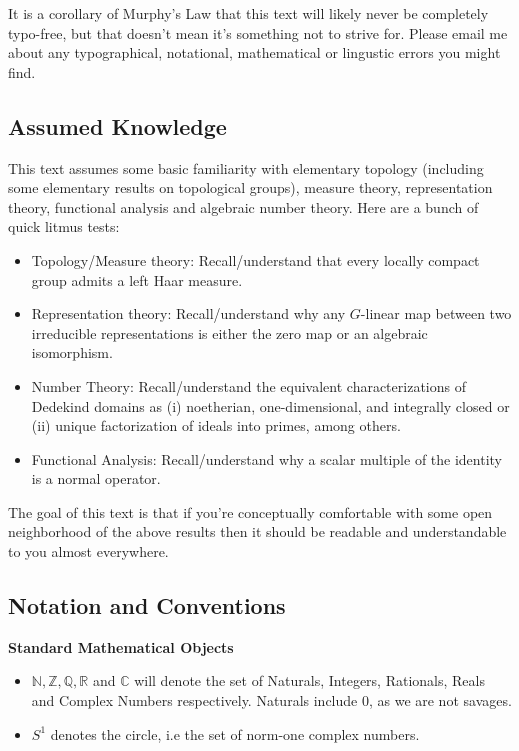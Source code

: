 \documentclass[11pt, x11names, openany]{book}
\newcommand{\nn}{\mathbb{N}}
\newcommand{\zz}{\mathbb{Z}}
\newcommand{\qq}{\mathbb{Q}}
\newcommand{\rr}{\mathbb{R}}
\newcommand{\cc}{\mathbb{C}}
\begin{document}
It is a corollary of Murphy's Law that this text will likely never be completely typo-free, but that doesn't mean it's something not to strive for. Please email me about any typographical, notational, mathematical or lingustic errors you might find.

\newpage
\subsection*{Assumed Knowledge}

This text assumes some basic familiarity with elementary topology (including some elementary results on topological groups), measure theory, representation theory, functional analysis and algebraic number theory. Here are a bunch of quick litmus tests:
\begin{itemize}
    \item Topology/Measure theory: Recall/understand that every locally compact group admits a left Haar measure.
    \item Representation theory: Recall/understand why any $G$-linear map between two irreducible representations is either the zero map or an algebraic isomorphism.
    \item Number Theory: Recall/understand the equivalent characterizations of Dedekind domains as (i) noetherian, one-dimensional, and integrally closed or (ii) unique factorization of ideals into primes, among others.
    \item Functional Analysis: Recall/understand why a scalar multiple of the identity is a normal operator.
\end{itemize}
The goal of this text is that if you're conceptually comfortable with some open neighborhood of the above results then it should be readable and understandable to you almost everywhere.


\newpage
\subsection*{Notation and Conventions}

\textbf{Standard Mathematical Objects}
\begin{itemize}
    \item $\nn, \zz, \qq, \rr$ and $\cc$ will denote the set of Naturals, Integers, Rationals, Reals and Complex Numbers respectively. Naturals include 0, as we are not savages.
    \item $S^1$ denotes the circle, i.e the set of norm-one complex numbers.
\end{itemize}
\end{document}
